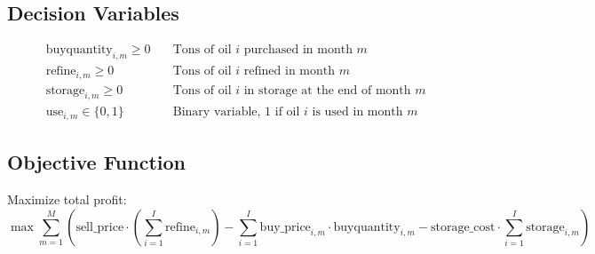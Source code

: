\documentclass{article}
\begin{document}
\subsection*{Decision Variables}
\begin{align*}
    &\text{buyquantity}_{i,m} \geq 0 &\quad \text{Tons of oil $i$ purchased in month $m$} \\
    &\text{refine}_{i,m} \geq 0 &\quad \text{Tons of oil $i$ refined in month $m$} \\
    &\text{storage}_{i,m} \geq 0 &\quad \text{Tons of oil $i$ in storage at the end of month $m$} \\
    &\text{use}_{i,m} \in \{0,1\} &\quad \text{Binary variable, 1 if oil $i$ is used in month $m$} 
\end{align*}

\subsection*{Objective Function}
Maximize total profit:
\[
\max \sum_{m=1}^{M} \left( \text{sell\_price} \cdot \left(\sum_{i=1}^{I} \text{refine}_{i,m}\right) - \sum_{i=1}^{I} \text{buy\_price}_{i,m} \cdot \text{buyquantity}_{i,m} - \text{storage\_cost} \cdot \sum_{i=1}^{I} \text{storage}_{i,m} \right)
\]
\end{document}

